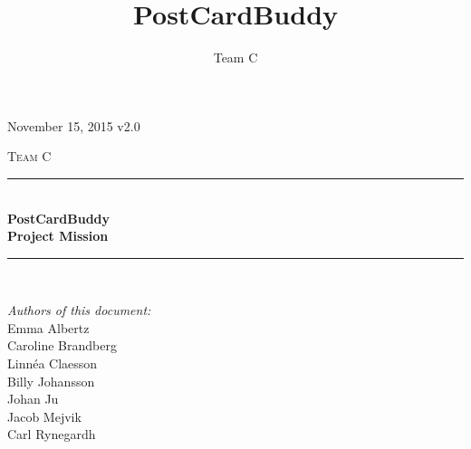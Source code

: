 \documentclass[10pt,a4paper]{article}
\title{PostCardBuddy}
\author{Team C}
\begin{document}
\begin{titlepage}
\newcommand{\HRule}{\rule{\linewidth}{0.5mm}}


\begin{flushright}
November 15, 2015 v2.0\\[3cm]
\end{flushright}


\centering
\textsc{\LARGE Team C}\\[0.5cm]

\HRule \\[0.4cm]
{ \huge \bfseries PostCardBuddy}\\[0.3cm]
{\Large \bfseries Project Mission}\\[0.4cm] %
\HRule \\[1.5cm]

\vfill
\begin{flushleft}
\textit{Authors of this document:}\\
Emma Albertz\\
Caroline Brandberg\\
Linnéa Claesson\\
Billy Johansson\\
Johan Ju\\
Jacob Mejvik\\
Carl Rynegardh
\end{flushleft}

\end{titlepage}



%



\setcounter{tocdepth}{2}
\tableofcontents
\newpage
{}




\end{document}
